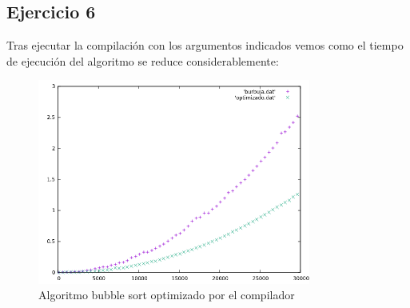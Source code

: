 \subsection*{Ejercicio 6}

\begin{flushleft}
  Tras ejecutar la compilación con los argumentos indicados vemos como
el tiempo de ejecución del algoritmo se reduce considerablemente:
\end{flushleft}

\begin{figure}[H]
  \caption{Algoritmo bubble sort optimizado por el compilador}
  \centering
    \includegraphics[width=0.8\textwidth]{comparacion.png}
\end{figure}
